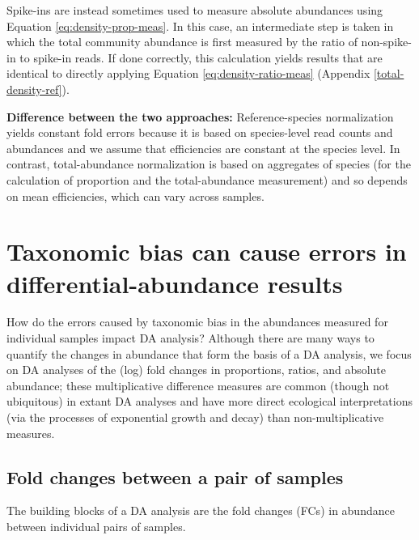 \documentclass[
]{article}
\begin{document}
Spike-ins are instead sometimes used to measure absolute abundances using Equation \eqref{eq:density-prop-meas}.
In this case, an intermediate step is taken in which the total community abundance is first measured by the ratio of non-spike-in to spike-in reads.
If done correctly, this calculation yields results that are identical to directly applying Equation \eqref{eq:density-ratio-meas} (Appendix \ref{total-density-ref}).

\textbf{Difference between the two approaches:}
Reference-species normalization yields constant fold errors because it is based on species-level read counts and abundances and we assume that efficiencies are constant at the species level.
In contrast, total-abundance normalization is based on aggregates of species (for the calculation of proportion and the total-abundance measurement) and so depends on mean efficiencies, which can vary across samples.

\hypertarget{differential-abundance}{%
\section{Taxonomic bias can cause errors in differential-abundance results}\label{differential-abundance}}

How do the errors caused by taxonomic bias in the abundances measured for individual samples impact DA analysis?
Although there are many ways to quantify the changes in abundance that form the basis of a DA analysis, we focus on DA analyses of the (log) fold changes in proportions, ratios, and absolute abundance; these multiplicative difference measures are common (though not ubiquitous) in extant DA analyses and have more direct ecological interpretations (via the processes of exponential growth and decay) than non-multiplicative measures.

\hypertarget{fold-changes-between-a-pair-of-samples}{%
\subsection{Fold changes between a pair of samples}\label{fold-changes-between-a-pair-of-samples}}

The building blocks of a DA analysis are the fold changes (FCs) in abundance between individual pairs of samples.
\end{document}

